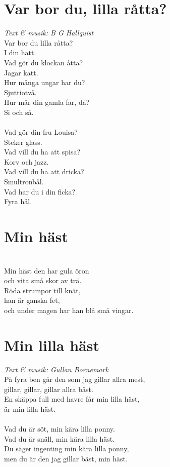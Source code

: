 \section{Var bor du, lilla råtta?}
\textit{Text & musik: B G Hallquist}
\vspace{2mm}\\
Var bor du lilla råtta?\\
I din hatt.\\
Vad gör du klockan åtta?\\
Jagar katt.\\
Hur många ungar har du?\\
Sjuttiotvå.\\
Hur mår din gamla far, då?\\
Si och så.\\
\\
Vad gör din fru Louisa?\\
Steker glass.\\
Vad vill du ha att spisa?\\
Korv och jazz.\\
Vad vill du ha att dricka?\\
Smultronbål.\\
Vad har du i din ficka?\\
Fyra hål.

\section{Min häst}
\vspace{2mm}\\
Min häst den har gula öron\\
och vita små skor av trä.\\
Röda strumpor till knät,\\
han är ganska fet,\\
och under magen har han blå små vingar.

\section{Min lilla häst}
\textit{Text & musik: Gullan Bornemark}
\vspace{2mm}\\
På fyra ben går den som jag gillar allra mest,\\
gillar, gillar, gillar allra bäst.\\
En skäppa full med havre får min lilla häst,\\
är min lilla häst.\\
\\
Vad du är söt, min kära lilla ponny.\\
Vad du är snäll, min kära lilla häst.\\
Du säger ingenting min kära lilla ponny,\\
men du är den jag gillar bäst, min häst.

